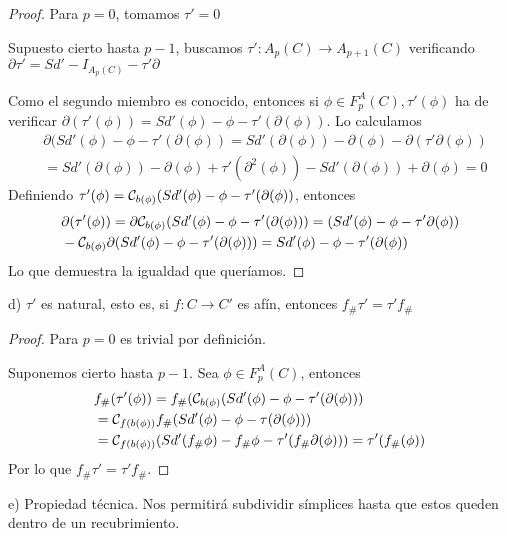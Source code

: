 \begin{proof}
  Para $p = 0$, tomamos $\tau' = 0$

  Supuesto cierto hasta $p-1$, buscamos $\tau' \colon A_p(C) \to A_{p+1}(C)$ verificando \\
  $\partial \tau' = Sd' - I_{A_p(C)} - \tau' \partial$

  Como el segundo miembro es conocido, entonces si $\phi \in F_p^A(C), \tau'(\phi)$ ha de verificar
  $\partial(\tau'(\phi)) = Sd'(\phi) - \phi - \tau'(\partial(\phi))$. Lo calculamos
  \begin{align*}
    &\partial(Sd'(\phi) - \phi - \tau'(\partial(\phi)) = Sd'(\partial(\phi)) - \partial(\phi) - \partial(\tau' \partial(\phi)) \\
    &= Sd'(\partial(\phi)) - \partial(\phi) + \tau'(\partial^2(\phi)) - Sd'(\partial(\phi)) + \partial(\phi) = 0
  \end{align*}
  Definiendo $\tau'(\phi) = {\mathcal C}_{b(\phi)}(Sd'(\phi) - \phi - \tau'(\partial(\phi))$, entonces
  \begin{align*}
    &\partial(\tau'(\phi)) = \partial {\mathcal C}_{b(\phi)}(Sd'(\phi) - \phi -\tau'(\partial(\phi))) = (Sd'(\phi) - \phi - \tau' \partial(\phi)) \\
    &- {\mathcal C}_{b(\phi)} \partial(Sd'(\phi) - \phi - \tau'(\partial(\phi))) = Sd'(\phi) - \phi - \tau'(\partial(\phi))
  \end{align*}
  Lo que demuestra la igualdad que queríamos.
\end{proof}

d) $\tau'$ es natural, esto es, si $f \colon C \to C'$ es afín, entonces $f_\# \tau' = \tau' f_\#$

\begin{proof}
  Para $p = 0$ es trivial por definición.

  Suponemos cierto hasta $p-1$. Sea $\phi \in F_p^A(C)$, entonces
  \begin{align*}
    &f_\#(\tau'(\phi)) = f_\#({\mathcal C}_{b(\phi)}(Sd'(\phi) - \phi - \tau'(\partial(\phi))) \\
    &= {\mathcal C}_{f(b(\phi))} f_\#(Sd'(\phi) - \phi - \tau(\partial(\phi))) \\
    &= {\mathcal C}_{f(b(\phi))}(Sd'(f_\# \phi) - f_\# \phi - \tau'(f_\# \partial(\phi))) = \tau'(f_\#(\phi))
  \end{align*}
  Por lo que $f_\# \tau' = \tau' f_\#$.
\end{proof}

e) Propiedad técnica. Nos permitirá subdividir símplices hasta que estos queden dentro de un recubrimiento.

